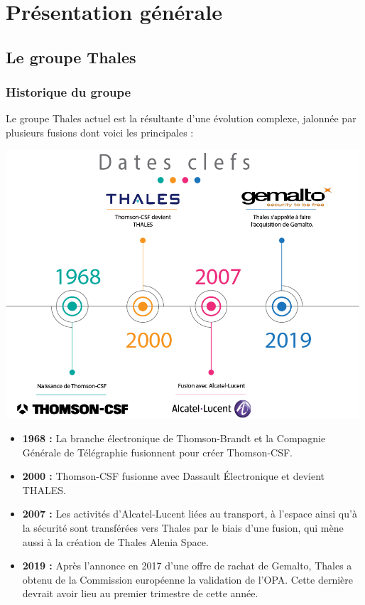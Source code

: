 \chapter{Présentation générale}
\section{Le groupe Thales}
\subsection{Historique du groupe}

Le groupe Thales actuel est la résultante d'une évolution complexe,  jalonnée par plusieurs fusions dont voici les principales :
\begin{center}
\includegraphics[height=10cm]{ressources/images/figures/timeline.png}
\end{center}

\begin{itemize}
    \item \textbf{1968 :} La branche électronique de Thomson-Brandt et la Compagnie Générale de Télégraphie fusionnent pour créer Thomson-CSF.
    \item \textbf{2000 :} Thomson-CSF fusionne avec Dassault Électronique et devient THALES.
    \item \textbf{2007 :} Les activités d'Alcatel-Lucent liées au transport, à l'espace ainsi qu'à la sécurité sont transférées vers Thales par le biais d'une fusion, qui mène aussi à la création de Thales Alenia Space.
    \item \textbf{2019 :} Après l'annonce en 2017 d'une offre de rachat de Gemalto, Thales a obtenu de la Commission européenne la validation de l'OPA. Cette dernière devrait avoir lieu au premier trimestre de cette année.
\end{itemize}


